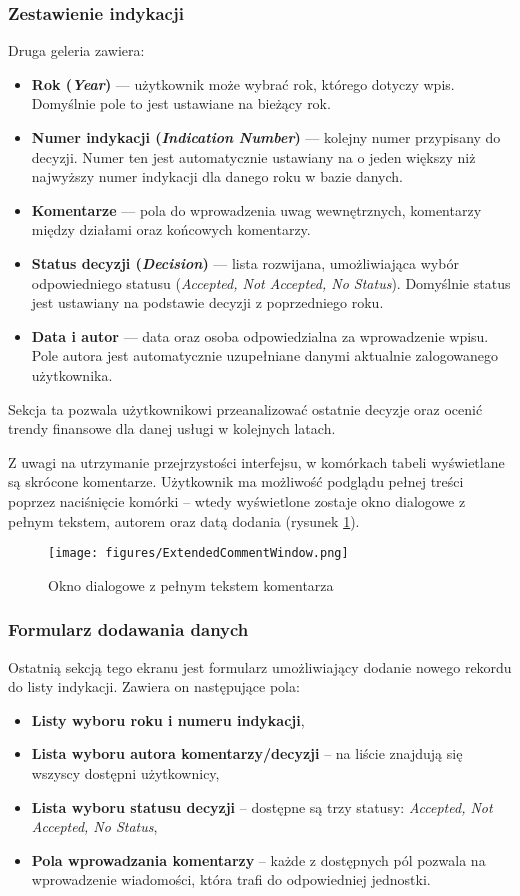 \subsubsection*{Zestawienie indykacji}
Druga geleria zawiera:
 \begin{itemize}
 \item \textbf{Rok (\emph{Year})} — użytkownik może wybrać rok, którego dotyczy wpis. Domyślnie pole to jest ustawiane na bieżący rok.
 \item \textbf{Numer indykacji (\emph{Indication Number})} — kolejny numer przypisany do decyzji. Numer ten jest automatycznie ustawiany na o jeden większy niż najwyższy numer indykacji dla danego roku w bazie danych.
 \item \textbf{Komentarze} — pola do wprowadzenia uwag wewnętrznych, komentarzy między działami oraz końcowych komentarzy.
 \item \textbf{Status decyzji (\emph{Decision})} — lista rozwijana, umożliwiająca wybór odpowiedniego statusu (\emph{Accepted, Not Accepted, No Status}). Domyślnie status jest ustawiany na podstawie decyzji z poprzedniego roku.
 \item \textbf{Data i autor} — data oraz osoba odpowiedzialna za wprowadzenie wpisu. Pole autora jest automatycznie uzupełniane danymi aktualnie zalogowanego użytkownika.
 \end{itemize}
 Sekcja ta pozwala użytkownikowi przeanalizować ostatnie decyzje oraz ocenić trendy finansowe dla danej usługi w kolejnych latach.

 Z uwagi na utrzymanie przejrzystości interfejsu, w komórkach tabeli wyświetlane są skrócone komentarze. Użytkownik ma możliwość podglądu pełnej treści poprzez naciśnięcie komórki -- wtedy wyświetlone zostaje okno dialogowe z pełnym tekstem, autorem oraz datą dodania (rysunek \ref{fig:extendedcommentwindow}).

 \begin{figure}[H]
    \centering
    \texttt{[image: figures/ExtendedCommentWindow.png]}
    \caption{Okno dialogowe z pełnym tekstem komentarza}
    \label{fig:extendedcommentwindow}
\end{figure}


\subsubsection*{Formularz dodawania danych}
 Ostatnią sekcją tego ekranu jest formularz umożliwiający dodanie nowego rekordu do listy indykacji. Zawiera on następujące pola:
 \begin{itemize}
 \item \textbf{Listy wyboru roku i numeru indykacji},
 \item \textbf{Lista wyboru autora komentarzy/decyzji} -- na liście znajdują się wszyscy dostępni użytkownicy,
 \item \textbf{Lista wyboru statusu decyzji} -- dostępne są trzy statusy: \emph{Accepted, Not Accepted, No Status},
 \item \textbf{Pola wprowadzania komentarzy} -- każde z dostępnych pól pozwala na wprowadzenie wiadomości, która trafi do odpowiedniej jednostki.
 \end{itemize}

